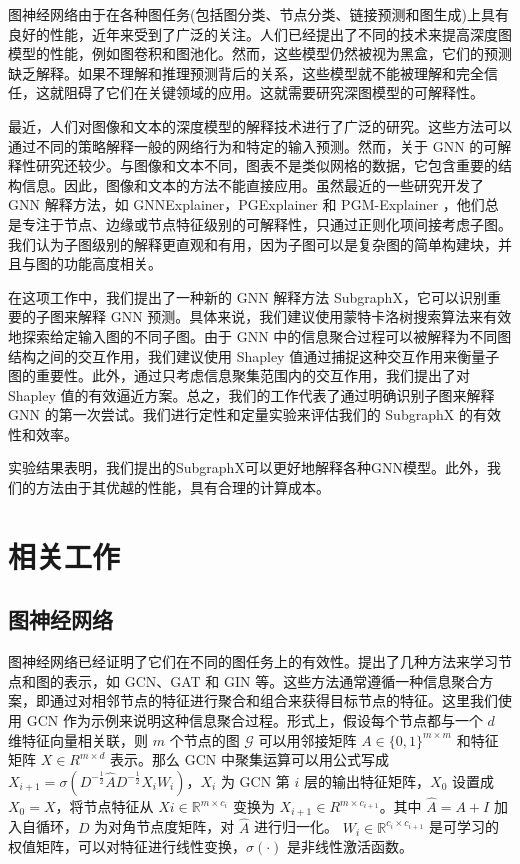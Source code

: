 \documentclass[final]{cvpr}
\begin{document}
图神经网络由于在各种图任务(包括图分类、节点分类、链接预测和图生成)上具有良好的性能，近年来受到了广泛的关注。人们已经提出了不同的技术来提高深度图模型的性能，例如图卷积和图池化。然而，这些模型仍然被视为黑盒，它们的预测缺乏解释。如果不理解和推理预测背后的关系，这些模型就不能被理解和完全信任，这就阻碍了它们在关键领域的应用。这就需要研究深图模型的可解释性。

最近，人们对图像和文本的深度模型的解释技术进行了广泛的研究。这些方法可以通过不同的策略解释一般的网络行为和特定的输入预测。然而，关于 GNN 的可解释性研究还较少。与图像和文本不同，图表不是类似网格的数据，它包含重要的结构信息。因此，图像和文本的方法不能直接应用。虽然最近的一些研究开发了 GNN 解释方法，如 GNNExplainer，PGExplainer 和 PGM-Explainer ，他们总是专注于节点、边缘或节点特征级别的可解释性，只通过正则化项间接考虑子图。我们认为子图级别的解释更直观和有用，因为子图可以是复杂图的简单构建块，并且与图的功能高度相关。

在这项工作中，我们提出了一种新的 GNN 解释方法 SubgraphX，它可以识别重要的子图来解释 GNN 预测。具体来说，我们建议使用蒙特卡洛树搜索算法来有效地探索给定输入图的不同子图。由于 GNN 中的信息聚合过程可以被解释为不同图结构之间的交互作用，我们建议使用 Shapley 值通过捕捉这种交互作用来衡量子图的重要性。此外，通过只考虑信息聚集范围内的交互作用，我们提出了对 Shapley 值的有效逼近方案。总之，我们的工作代表了通过明确识别子图来解释 GNN 的第一次尝试。我们进行定性和定量实验来评估我们的 SubgraphX 的有效性和效率。

实验结果表明，我们提出的SubgraphX可以更好地解释各种GNN模型。此外，我们的方法由于其优越的性能，具有合理的计算成本。

\section{相关工作} \label{sec:RelatedWorks}

\subsection{图神经网络}

图神经网络已经证明了它们在不同的图任务上的有效性。提出了几种方法来学习节点和图的表示，如 GCN、GAT 和 GIN 等。这些方法通常遵循一种信息聚合方案，即通过对相邻节点的特征进行聚合和组合来获得目标节点的特征。这里我们使用 GCN 作为示例来说明这种信息聚合过程。形式上，假设每个节点都与一个 $d$ 维特征向量相关联，则 $m$ 个节点的图 $\mathcal{G}$ 可以用邻接矩阵 $A\in\{0,1\}^{m\times m}$ 和特征矩阵 $X\in R^{m\times d}$ 表示。那么 GCN 中聚集运算可以用公式写成 $X_{i+1}=\sigma(D^{-\frac{1}{2}}\hat{A}D^{−\frac{1}{2}} X_iW_i)$，$X_i$ 为 GCN 第 $i$ 层的输出特征矩阵，$X_0$ 设置成 $X_0=X$，将节点特征从 $Xi\in \mathbb{R}^{m\times c_i}$ 变换为 $X_{i+1}\in R^{m\times c_{i+1}}$。其中 $\hat{A}=A+I$ 加入自循环，$D$ 为对角节点度矩阵，对 $\hat{A}$ 进行归一化。 $W_i\in \mathbb{R}^{c_i\times c_{i+1}}$ 是可学习的权值矩阵，可以对特征进行线性变换，$\sigma(\cdot)$ 是非线性激活函数。
\end{document}
